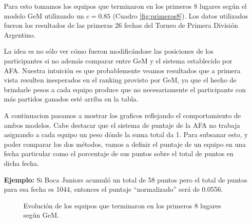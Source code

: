 Para esto tomamos los equipos que terminaron en los primeros 8 lugares según el modelo
GeM utilizando un $c = 0.85$ (Cuadro \ref{fig:primeros8}). Los datos utilizados
fueron los resultados de las primeras 26 fechas del Torneo de Primera División
Argentino.

La idea es no sólo ver cómo fueron modificándose las posiciones de los
participantes si no además comparar entre GeM y el sistema establecido por AFA.
Nuestra intuición es que probablemente veamos resultados que a primera vista
resulten inesperados en el ranking provisto por GeM, ya que el hecho de
brindarle pesos a cada equipo produce que no necesariamente el participante con
más partidos ganados esté arriba en la tabla.

A continuacion pasamos a mostrar los graficos reflejando el comportamiento de
ambos modelos. Cabe destacar que el sistema de puntaje de la AFA no trabaja
asignando a cada equipo un peso dónde la suma total da 1. Para subsanar esto,
y poder comparar los dos métodos, vamos a definir el puntaje de un equipo en una
fecha particular como el porcentaje de sus puntos sobre el total de puntos en dicha
fecha.

\textbf{Ejemplo:} Si Boca Juniors acumuló un total de 58 puntos pero el total de
puntos para esa fecha es 1044, entonces el puntaje ``normalizado'' será de
0.0556.

\begin{figure}[H]
	\centering
	\caption{Evolución de los equipos que terminaron en los primeros 8 lugares
	según GeM.}
	\label{fig:gem_evo}
\end{figure}

